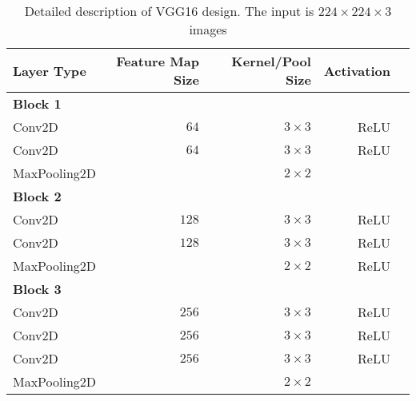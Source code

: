 \begin{table}[H]
	\centering
	\caption{Detailed description of VGG16 design. The input is $224 \times 224 \times3$ images}
	\label{tab:vgg16}
 	\begin{tabular}{lrrrr}
		\textbf{Layer Type}     & \textbf{Feature Map Size} & \textbf{Kernel/Pool Size} & \textbf{Activation}  \\ \hline
		\textbf{Block 1}        &                           &                           &                                     \\
		\rowcolor{lightGrey}  
		Conv2D                  & $64$                      & $3\times3$                & ReLU                                \\
		Conv2D                  & $64$                      & $3\times3$                & ReLU                                \\
		\rowcolor{lightGrey} 
		MaxPooling2D            &                           & $2\times2$                &                                     \\
		\textbf{Block 2}        &                           &                           &                                     \\
		\rowcolor{lightGrey}  
		Conv2D                  & $128$                     & $3\times3$                & ReLU                                \\
		Conv2D                  & $128$                     & $3\times3$                & ReLU                                \\
		\rowcolor{lightGrey}  
		MaxPooling2D            &                       &    $2\times2$             & ReLU                                \\
		\textbf{Block 3}        &                           &                           &                                    \\
		\rowcolor{lightGrey}  
		Conv2D                  & $256$                     & $3\times3$                & ReLU                                \\
		Conv2D                  & $256$                     & $3\times3$                & ReLU                                \\
		\rowcolor[HTML]{EFEFEF} 
		Conv2D                  & $256$                     & $3\times3$                & ReLU                                \\
		MaxPooling2D            &               &          $2\times2$                  &                                     \\

\end{tabular}
\end{table}
